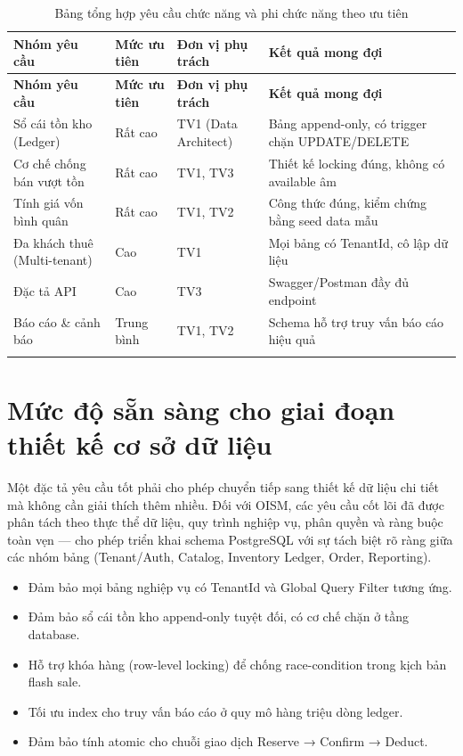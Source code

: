 \begin{longtable}{|p{2.6cm}|p{2.2cm}|p{3cm}|p{4.6cm}|}
\hline
\textbf{Nhóm yêu cầu} & \textbf{Mức ưu tiên} & \textbf{Đơn vị phụ trách} & \textbf{Kết quả mong đợi} \\
\hline
\endfirsthead
\hline
\textbf{Nhóm yêu cầu} & \textbf{Mức ưu tiên} & \textbf{Đơn vị phụ trách} & \textbf{Kết quả mong đợi} \\
\hline
\endhead
Sổ cái tồn kho (Ledger) & Rất cao & TV1 (Data Architect) & Bảng append-only, có trigger chặn UPDATE/DELETE \\
\hline
Cơ chế chống bán vượt tồn & Rất cao & TV1, TV3 & Thiết kế locking đúng, không có available âm \\
\hline
Tính giá vốn bình quân & Rất cao & TV1, TV2 & Công thức đúng, kiểm chứng bằng seed data mẫu \\
\hline
Đa khách thuê (Multi-tenant) & Cao & TV1 & Mọi bảng có TenantId, cô lập dữ liệu \\
\hline
Đặc tả API & Cao & TV3 & Swagger/Postman đầy đủ endpoint \\
\hline
Báo cáo \& cảnh báo & Trung bình & TV1, TV2 & Schema hỗ trợ truy vấn báo cáo hiệu quả \\
\hline
\caption{Bảng tổng hợp yêu cầu chức năng và phi chức năng theo ưu tiên}
\end{longtable}

\section{Mức độ sẵn sàng cho giai đoạn thiết kế cơ sở dữ liệu}

Một đặc tả yêu cầu tốt phải cho phép chuyển tiếp sang thiết kế dữ liệu chi tiết mà không cần giải thích thêm nhiều. Đối với OISM, các yêu cầu cốt lõi đã được phân tách theo thực thể dữ liệu, quy trình nghiệp vụ, phân quyền và ràng buộc toàn vẹn — cho phép triển khai schema PostgreSQL với sự tách biệt rõ ràng giữa các nhóm bảng (Tenant/Auth, Catalog, Inventory Ledger, Order, Reporting).

\begin{itemize}
    \item Đảm bảo mọi bảng nghiệp vụ có TenantId và Global Query Filter tương ứng.
    \item Đảm bảo sổ cái tồn kho append-only tuyệt đối, có cơ chế chặn ở tầng database.
    \item Hỗ trợ khóa hàng (row-level locking) để chống race-condition trong kịch bản flash sale.
    \item Tối ưu index cho truy vấn báo cáo ở quy mô hàng triệu dòng ledger.
    \item Đảm bảo tính atomic cho chuỗi giao dịch Reserve → Confirm → Deduct.
\end{itemize}

